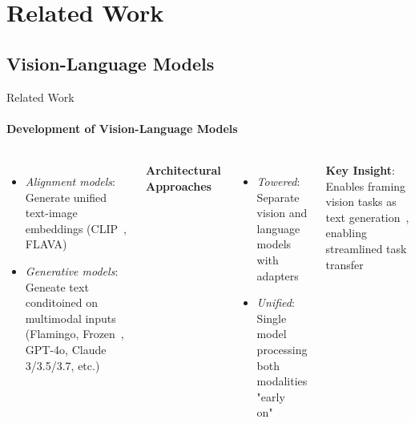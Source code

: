\documentclass[aspectratio=169]{beamer}
\begin{document}
\section{Related Work}
\subsection{Vision-Language Models}
\begin{frame}{Related Work}
\framesubtitle{Development of Vision-Language Models}
  \begin{columns}[T]
    \begin{itemize}
      \item \emph{Alignment models}: Generate unified text-image embeddings (CLIP~, FLAVA)
      \item \emph{Generative models}: Geneate text conditoined on multimodal inputs (Flamingo, Frozen~, GPT-4o, Claude 3/3.5/3.7, etc.)
    \end{itemize}
      \textbf{Architectural Approaches}
      \begin{itemize}
        \item \emph{Towered}: Separate vision and language models with adapters
        \item \emph{Unified}: Single model processing both modalities "early on"~
      \end{itemize}
      \vspace{0.3em}
      \textbf{Key Insight}: Enables framing vision tasks as text generation~, enabling streamlined task transfer
  \end{columns}
\end{frame}
\end{document}
